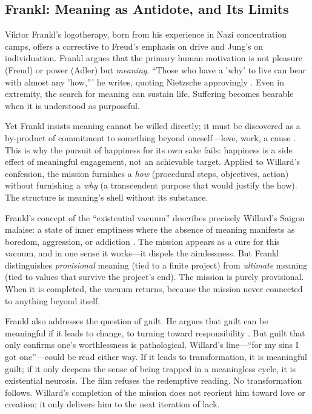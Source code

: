 \subsection*{Frankl: Meaning as Antidote, and Its Limits}
\label{ssec:vi-frankl}

Viktor Frankl's logotherapy, born from his experience in Nazi concentration camps, offers a
corrective to Freud's emphasis on drive and Jung's on individuation. Frankl argues that the
primary human motivation is not pleasure (Freud) or power (Adler) but \emph{meaning}.
``Those who have a 'why' to live can bear with almost any 'how,''' he writes, quoting
Nietzsche approvingly \parencite[p.~104]{FranklMeaning2006}. Even in extremity, the search
for meaning can sustain life. Suffering becomes bearable when it is understood as purposeful.

Yet Frankl insists meaning cannot be willed directly; it must be discovered as a by-product of
commitment to something beyond oneself---love, work, a cause
\parencite[pp.~110--115]{FranklMeaning2006}.
This is why the pursuit of happiness for its own sake fails: happiness is a side effect of
meaningful engagement, not an achievable target. Applied to Willard's confession, the mission
furnishes a \emph{how} (procedural steps, objectives, action) without furnishing a \emph{why}
(a transcendent purpose that would justify the how). The structure is meaning's shell without
its substance.

Frankl's concept of the ``existential vacuum'' describes precisely Willard's Saigon malaise: a
state of inner emptiness where the absence of meaning manifests as boredom, aggression, or
addiction \parencite[pp.~127--129]{FranklMeaning2006}. The mission appears as a cure for this
vacuum, and in one sense it works---it dispels the aimlessness. But Frankl distinguishes
\emph{provisional} meaning (tied to a finite project) from \emph{ultimate} meaning (tied to
values that survive the project's end). The mission is purely provisional. When it is
completed, the vacuum returns, because the mission never connected to anything beyond itself.

Frankl also addresses the question of guilt. He argues that guilt can be meaningful if it
leads to change, to turning toward responsibility \parencite[pp.~131--133]{FranklMeaning2006}.
But guilt that only confirms one's worthlessness is pathological. Willard's line---``for my
sins I got one''---could be read either way. If it leads to transformation, it is meaningful
guilt; if it only deepens the sense of being trapped in a meaningless cycle, it is existential
neurosis. The film refuses the redemptive reading. No transformation follows. Willard's
completion of the mission does not reorient him toward love or creation; it only delivers him
to the next iteration of lack.


